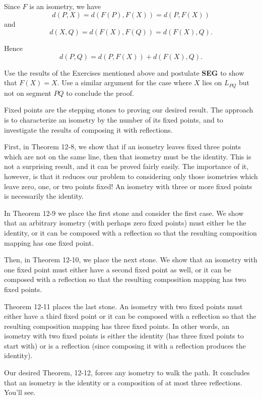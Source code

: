 \documentclass[12pt]{book} %
\begin{document}
\begin{ExerciseList}
\begin{ExerciseList}
\begin{ExerciseList}
Since $F$ is an isometry, we have
\[
d(P,X) = d(F(P),F(X)) = d(P,F(X))
\]
and
\[
d(X,Q) = d(F(X),F(Q)) = d(F(X),Q).
\]

Hence
\[
d(P,Q) = d(P,F(X)) + d(F(X),Q).
\]

Use the results of the Exercises mentioned above and postulate \textbf{SEG} to
show that $F(X) = X$. Use a similar argument for the case where $X$ lies
on $L_{PQ}$ but not on segment $PQ$ to conclude the proof.

Fixed points are the stepping stones to proving our desired result.
The approach is to characterize an isometry by the number of its fixed
points, and to investigate the results of composing it with reflections.

First, in Theorem 12-8, we show that if an isometry leaves fixed three
points which are not on the same line, then that isometry must be the
identity. This is not a surprising result, and it can be proved fairly
easily. The importance of it, however, is that it reduces our problem to
considering only those isometries which leave zero, one, or two points
fixed! An isometry with three or more fixed points is necessarily the
identity.

In Theorem 12-9 we place the first stone and consider the first case.
We show that an arbitrary isometry (with perhaps zero fixed points)
must either be the identity, or it can be composed with a reflection so
that the resulting composition mapping has one fixed point.

Then, in Theorem 12-10, we place the next stone. We show that an
isometry with one fixed point must either have a second fixed point as
well, or it can be composed with a reflection so that the resulting composition mapping has two fixed points.

Theorem 12-11 places the last stone. An isometry with two fixed
points must either have a third fixed point or it can be composed with a
reflection so that the resulting composition mapping has three fixed
points. In other words, an isometry with two fixed points is either the
identity (has three fixed points to start with) or is a reflection (since
composing it with a reflection produces the identity).

Our desired Theorem, 12-12, forces any isometry to walk the path. It
concludes that an isometry is the identity or a composition of at most
three reflections. You'll see.



\end{ExerciseList}
\end{ExerciseList}
\end{ExerciseList}
\end{document}

